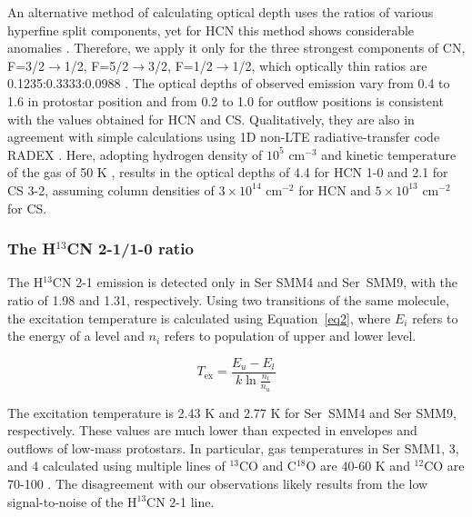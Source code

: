 \documentclass{aa}
\begin{document}
An alternative method of calculating optical depth
uses the ratios of various hyperfine split components, yet for HCN this method shows considerable anomalies
\citep{Lou12}. Therefore, we apply it only
for the three strongest components of CN, F=3/2$\rightarrow$1/2, F=5/2$\rightarrow$3/2, F=1/2$\rightarrow$1/2, which optically thin ratios are
0.1235:0.3333:0.0988 \citep{Ska83}. The optical
depths of observed emission vary from 0.4 to 1.6 in protostar
position and from 0.2 to 1.0 for outflow positions is consistent
with the values obtained for HCN and CS. Qualitatively,
they are also in agreement with simple calculations using 1D
non-LTE radiative-transfer code RADEX \citep{vdT07}. Here, adopting hydrogen density of $10^5$ cm$^{-3}$ and kinetic temperature of the gas of 50 K \citep{Mot14}, results in the optical
depths of 4.4 for HCN 1-0 and 2.1 for CS 3-2, assuming column densities of $3 \times 10^{14}$ cm$^{-2}$ for HCN and $5 \times 10^{13}$ cm$^{-2}$ for
CS.


\subsubsection{The H$^{13}$CN 2-1/1-0 ratio}
\label{subsection:temperature}

The H$^{13}$CN 2-1 emission is detected only in Ser SMM4 and Ser~SMM9, with the ratio of 1.98 and 1.31, respectively.
Using two transitions of the same molecule, the excitation temperature is calculated using Equation~\ref{eq2}, where $E_i$ refers to the energy of a level
and $n_i$ refers to population of upper and lower level.

\begin{equation} 
\label{eq2} 
T_{\mathrm{ex}} = \frac{E_u - E_l}{k \ln \frac{n_l}{n_u}} 
\end{equation}

The excitation temperature is 2.43 K and 2.77 K for Ser~SMM4 and Ser SMM9, respectively. 
These values are much lower than expected in envelopes and outflows of low-mass protostars. In particular,
gas temperatures in Ser SMM1, 3, and 4 calculated using multiple lines of $^{13}$CO and C$^{18}$O are 40-60 K 
and $^{12}$CO are 70-100 \citep{Yil12,Yil13}. The disagreement with our observations likely 
results from the low signal-to-noise of the H$^{13}$CN 2-1 line. 
\end{document}
